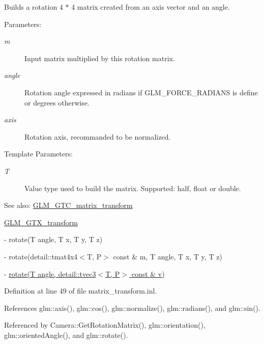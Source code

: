 Builds a rotation 4 $\ast$ 4 matrix created from an axis vector and an angle.

\begin{Desc}
\item[Parameters:]
\begin{description}
\item[{\em m}]Input matrix multiplied by this rotation matrix. \item[{\em angle}]Rotation angle expressed in radians if GLM\_\-FORCE\_\-RADIANS is define or degrees otherwise. \item[{\em axis}]Rotation axis, recommanded to be normalized. \end{description}
\end{Desc}
\begin{Desc}
\item[Template Parameters:]
\begin{description}
\item[{\em T}]Value type used to build the matrix. Supported: half, float or double. \end{description}
\end{Desc}
\begin{Desc}
\item[See also:]\hyperlink{group__gtc__matrix__transform}{GLM\_\-GTC\_\-matrix\_\-transform} 

\hyperlink{group__gtx__transform}{GLM\_\-GTX\_\-transform} 

- rotate(T angle, T x, T y, T z) 

- rotate(detail::tmat4x4$<$T, P$>$ const \& m, T angle, T x, T y, T z) 

- \hyperlink{group__gtx__transform_g52e753e0ad1cb6ae700855cc9ca921ca}{rotate(T angle, detail::tvec3$<$T, P$>$ const \& v)} \end{Desc}


Definition at line 49 of file matrix\_\-transform.inl.

References glm::axis(), glm::cos(), glm::normalize(), glm::radians(), and glm::sin().

Referenced by Camera::GetRotationMatrix(), glm::orientation(), glm::orientedAngle(), and glm::rotate().

